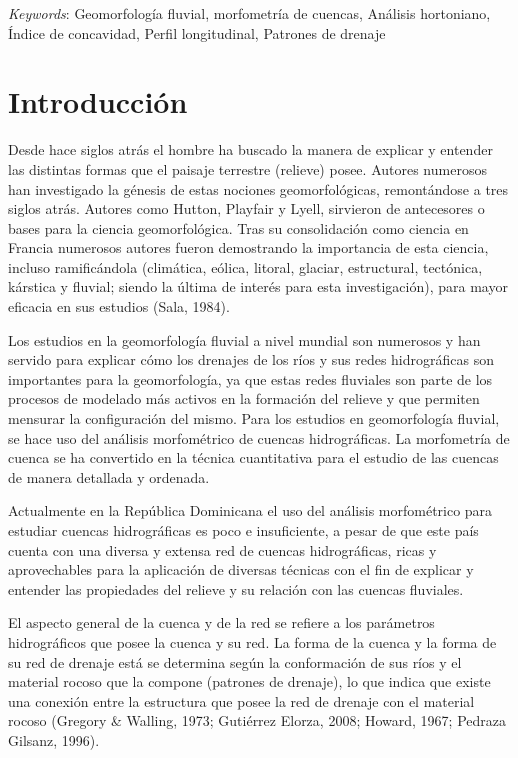 \documentclass[11pt,]{article}
\renewenvironment{abstract}
 {{%
    \setlength{\leftmargin}{0mm}
    \setlength{\rightmargin}{\leftmargin}%
  }%
  \relax}
 {\endlist}
\begin{document}
\begin{abstract}
\vskip 8.5pt \noindent \emph{Keywords}: Geomorfología fluvial, morfometría de cuencas, Análisis hortoniano,
Índice de concavidad, Perfil longitudinal, Patrones de drenaje \par

    \hbox{\vrule height .2pt width 39.14pc}



\end{abstract}


\vskip 6.5pt


\noindent  \section{Introducción}\label{introducciuxf3n}

Desde hace siglos atrás el hombre ha buscado la manera de explicar y
entender las distintas formas que el paisaje terrestre (relieve) posee.
Autores numerosos han investigado la génesis de estas nociones
geomorfológicas, remontándose a tres siglos atrás. Autores como Hutton,
Playfair y Lyell, sirvieron de antecesores o bases para la ciencia
geomorfológica. Tras su consolidación como ciencia en Francia numerosos
autores fueron demostrando la importancia de esta ciencia, incluso
ramificándola (climática, eólica, litoral, glaciar, estructural,
tectónica, kárstica y fluvial; siendo la última de interés para esta
investigación), para mayor eficacia en sus estudios (Sala, 1984).

Los estudios en la geomorfología fluvial a nivel mundial son numerosos y
han servido para explicar cómo los drenajes de los ríos y sus redes
hidrográficas son importantes para la geomorfología, ya que estas redes
fluviales son parte de los procesos de modelado más activos en la
formación del relieve y que permiten mensurar la configuración del
mismo. Para los estudios en geomorfología fluvial, se hace uso del
análisis morfométrico de cuencas hidrográficas. La morfometría de cuenca
se ha convertido en la técnica cuantitativa para el estudio de las
cuencas de manera detallada y ordenada.

Actualmente en la República Dominicana el uso del análisis morfométrico
para estudiar cuencas hidrográficas es poco e insuficiente, a pesar de
que este país cuenta con una diversa y extensa red de cuencas
hidrográficas, ricas y aprovechables para la aplicación de diversas
técnicas con el fin de explicar y entender las propiedades del relieve y
su relación con las cuencas fluviales.

El aspecto general de la cuenca y de la red se refiere a los parámetros
hidrográficos que posee la cuenca y su red. La forma de la cuenca y la
forma de su red de drenaje está se determina según la conformación de
sus ríos y el material rocoso que la compone (patrones de drenaje), lo
que indica que existe una conexión entre la estructura que posee la red
de drenaje con el material rocoso (Gregory \& Walling, 1973; Gutiérrez
Elorza, 2008; Howard, 1967; Pedraza Gilsanz, 1996).
\end{document}
